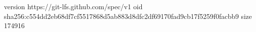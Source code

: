 version https://git-lfs.github.com/spec/v1
oid sha256:c554dd2eb68df7cf5517868d5ab883d8dfc2df69170fad9cb17f5259f0facbb9
size 174916
